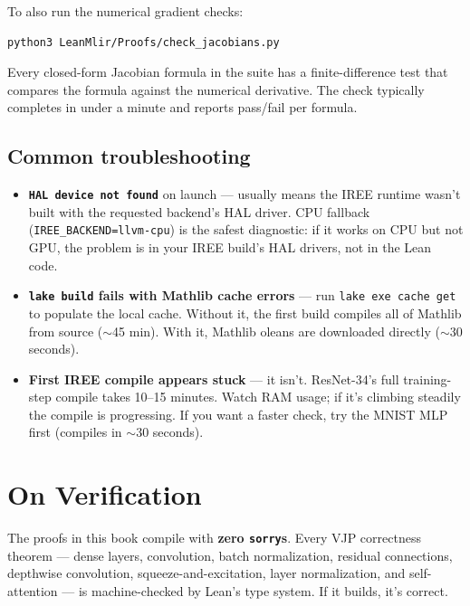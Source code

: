 To also run the numerical gradient checks:

\begin{verbatim}
python3 LeanMlir/Proofs/check_jacobians.py
\end{verbatim}

Every closed-form Jacobian formula in the suite has a
finite-difference test that compares the formula against the
numerical derivative. The check typically completes in under a
minute and reports pass/fail per formula.

\section*{Common troubleshooting}

\begin{itemize}
  \item \textbf{\texttt{HAL device not found}} on launch --- usually
    means the IREE runtime wasn't built with the requested backend's
    HAL driver. CPU fallback (\texttt{IREE\_BACKEND=llvm-cpu}) is
    the safest diagnostic: if it works on CPU but not GPU, the
    problem is in your IREE build's HAL drivers, not in the Lean
    code.
  \item \textbf{\texttt{lake build} fails with Mathlib cache
    errors} --- run \texttt{lake exe cache get} to populate the
    local cache. Without it, the first build compiles all of
    Mathlib from source ($\sim$45 min). With it, Mathlib oleans are
    downloaded directly ($\sim$30 seconds).
  \item \textbf{First IREE compile appears stuck} --- it isn't.
    ResNet-34's full training-step compile takes 10--15 minutes.
    Watch RAM usage; if it's climbing steadily the compile is
    progressing. If you want a faster check, try the MNIST MLP
    first (compiles in $\sim$30 seconds).
\end{itemize}

\chapter{On Verification}
\label{app:verification}

The proofs in this book compile with \textbf{zero \texttt{sorry}s}.
Every VJP correctness theorem --- dense layers, convolution, batch
normalization, residual connections, depthwise convolution,
squeeze-and-excitation, layer normalization, and self-attention ---
is machine-checked by Lean's type system. If it builds, it's correct.

